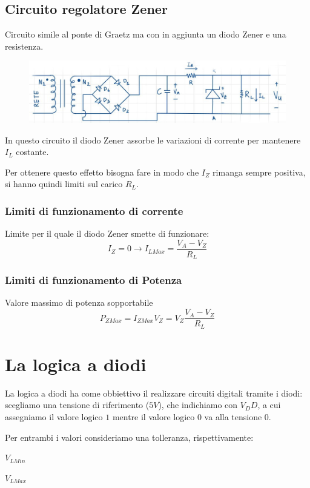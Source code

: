 \documentclass[11pt,a4paper,]{article}
\begin{document}
\subsection{Circuito regolatore Zener}
\begin{definizione}
    Circuito simile al ponte di Graetz ma con in aggiunta un diodo Zener e una resistenza.
    \begin{figure}[H]
        \centering
        \includegraphics[width=0.75\linewidth]{img/circ reg Z.png}
    \end{figure}
    In questo circuito il diodo Zener assorbe le variazioni di corrente per mantenere $I_L$ costante.
    \begin{nota}
        Per ottenere questo effetto bisogna fare in modo che $I_Z$ rimanga sempre positiva, si hanno quindi limiti sul carico $R_L$.
    \end{nota}
\end{definizione}
\subsubsection{Limiti di funzionamento di corrente}
Limite per il quale il diodo Zener smette di funzionare:
\[
I_Z = 0 \to I_{LMax} = \frac{V_A - V_Z}{R_L}
\]
\subsubsection{Limiti di funzionamento di Potenza}
Valore massimo di potenza sopportabile
\[
P_{ZMax} = I_{ZMax}V_Z = V_Z \frac{V_A - V_Z}{R_L}
\]

\section{La logica a diodi}
La logica a diodi ha come obbiettivo il realizzare circuiti digitali tramite i diodi: scegliamo una tensione di riferimento ($5V$), che indichiamo con ${V_DD}$, a cui assegniamo il valore logico $1$ mentre il valore logico $0$ va alla tensione $0$.
\begin{nota}
    Per entrambi i valori consideriamo una tolleranza, rispettivamente:
    \item $V_{LMin}$
    \item $V_{LMax}$
\end{nota}
\end{document}
